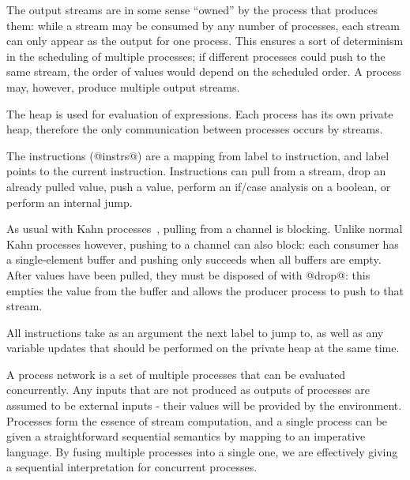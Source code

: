 The output streams are in some sense ``owned'' by the process that produces them: while a stream may be consumed by any number of processes, each stream can only appear as the output for one process.
This ensures a sort of determinism in the scheduling of multiple processes; if different processes could push to the same stream, the order of values would depend on the scheduled order.
A process may, however, produce multiple output streams.

The heap is used for evaluation of expressions.
Each process has its own private heap, therefore the only communication between processes occurs by streams.

The instructions (@instrs@) are a mapping from label to instruction, and label points to the current instruction.
Instructions can pull from a stream, drop an already pulled value, push a value, perform an if/case analysis on a boolean, or perform an internal jump.

As usual with Kahn processes~\cite{kahn1976coroutines}, pulling from a channel is blocking.
Unlike normal Kahn processes however, pushing to a channel can also block: each consumer has a single-element buffer and pushing only succeeds when all buffers are empty.
After values have been pulled, they must be disposed of with @drop@: this empties the value from the buffer and allows the producer process to push to that stream.

All instructions take as an argument the next label to jump to, as well as any variable updates that should be performed on the private heap at the same time.

A process network is a set of multiple processes that can be evaluated concurrently.
Any inputs that are not produced as outputs of processes are assumed to be external inputs - their values will be provided by the environment.
Processes form the essence of stream computation, and a single process can be given a straightforward sequential semantics by mapping to an imperative language.
By fusing multiple processes into a single one, we are effectively giving a sequential interpretation for concurrent processes.


